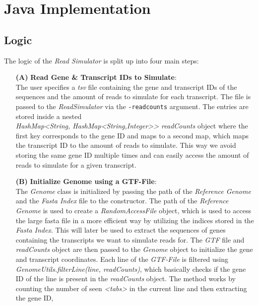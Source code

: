 \documentclass[12pt]{article}
\begin{document}

\section{Java Implementation}
\subsection{Logic}\label{sec:logic}
The logic of the \textit{Read Simulator} is split up into four main steps:
\begin{enumerate}
	\item[\textbf{(A)}] \textbf{Read Gene \& Transcript IDs to Simulate}:\\
		The user specifies a \textit{tsv} file containing the gene and transcript IDs of the sequences and the
		amount of reads to simulate for each transcript. The file is passed to the \textit{ReadSimulator}
		via the \texttt{-readcounts} argument. The entries are stored inside a nested \\
		\textit{HashMap<String, HashMap<String,Integer>\hspace{0.1mm}> readCounts} object where
		the first key corresponds to the gene ID and maps to a second map, which maps the transcript ID to the amount of reads to simulate.
		This way we avoid storing the same gene ID multiple times and can easily access the amount of reads to simulate for a given transcript.
	\item[\textbf{(B)}] \textbf{Initialize Genome using a GTF-File}:\\
		The \textit{Genome} class is initialized by passing the path of the \textit{Reference Genome} and the \textit{Fasta Index} file to the constructor.
		The path of the \textit{Reference Genome} is used to create a \textit{RandomAccessFile} object, which is used to
		access the large fasta file in a more efficient way by utilizing the indices stored in the \textit{Fasta Index}.
		This will later be used to extract the sequences of genes containing the transcripts we want to simulate reads for.
		The \textit{GTF} file and \textit{readCounts} object are then passed to the \textit{Genome} object to initialize the gene and transcript coordinates.
		Each line of the \textit{GTF-File} is filtered using \textit{GenomeUtils.filterLine(line, readCounts)}, which
		basically checks if the gene ID of the line is present in the \textit{readCounts} object.
		The method works by counting the number of seen \textit{<tabs>} in the current line and then extracting the gene ID,

\end{enumerate}
\end{document}
